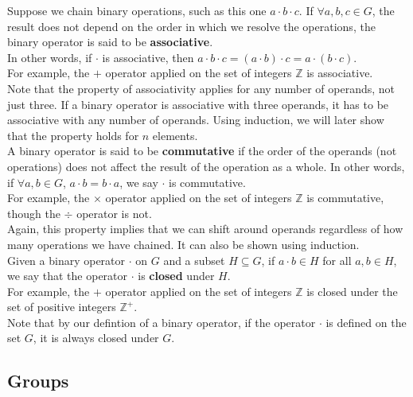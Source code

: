 \documentclass[12pt]{article}
\newcommand{\Z}{\mathbb{Z}}
\begin{document}
    Suppose we chain binary operations,
    such as this one $a \cdot b \cdot c$.
    If $\forall a, b, c \in G$,
    the result does not depend on the order
    in which we resolve the operations,
    the binary operator is said to be \textbf{associative}. \\
    In other words, if $\cdot$ is associative,
    then
    $a \cdot b \cdot c = (a \cdot b) \cdot c = a \cdot (b \cdot c)$. \\
    For example,
    the $+$ operator applied on the set of integers $\Z$
    is associative. \\
    Note that the property of associativity
    applies for any number of operands,
    not just three.
    If a binary operator is associative with three operands,
    it has to be associative with any number of operands.
    Using induction,
    we will later show that the property holds for $n$ elements. \\

    A binary operator is said to be \textbf{commutative}
    if the order of the operands (not operations) does not affect
    the result of the operation as a whole.
    In other words, if $\forall a, b \in G$,
    $a \cdot b = b \cdot a$,
    we say $\cdot$ is commutative. \\
    For example,
    the $\times$ operator applied on the set of integers $\Z$
    is commutative,
    though the $\div$ operator is not. \\
    Again, this property implies that we can shift around operands
    regardless of how many operations we have chained.
    It can also be shown using induction. \\

    Given a binary operator $\cdot$ on $G$
    and a subset $H \subseteq G$,
    if $a \cdot b \in H$ for all $a, b \in H$,
    we say that the operator $\cdot$ is \textbf{closed} under $H$. \\
    For example,
    the $+$ operator applied on the set of integers $\Z$
    is closed under the set of positive integers $\Z^+$. \\
    Note that by our defintion of a binary operator,
    if the operator $\cdot$ is defined on the set $G$,
    it is always closed under $G$. \\
    

    \subsection*{Groups}
\end{document}
